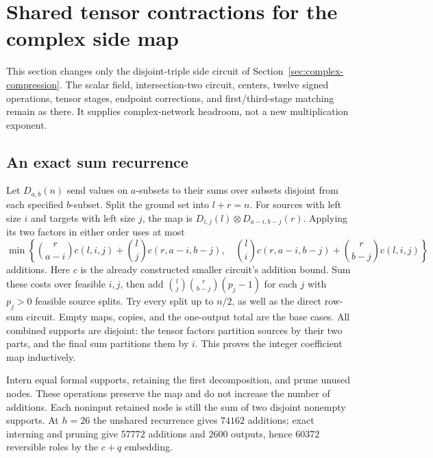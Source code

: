 \section{Shared tensor contractions for the complex side map}
\label{sec:disjoint-tensor-compression}
This section changes only the disjoint-triple side circuit of
Section~\ref{sec:complex-compression}. The scalar field, intersection-two
circuit, centers, twelve signed operations, tensor stages, endpoint
corrections, and first/third-stage matching remain as there. It supplies
complex-network headroom, not a new multiplication exponent.

\subsection{An exact sum recurrence}
Let $D_{a,b}(n)$ send values on $a$-subsets to their sums over subsets
disjoint from each specified $b$-subset. Split the ground set into $l+r=n$.
For sources with left size $i$ and targets with left size $j$, the map is
$D_{i,j}(l)\otimes D_{a-i,b-j}(r)$. Applying its two factors in either order
uses at most
\[
 \min\left\{\binom r{a-i}c(l,i,j)+\binom lj c(r,a-i,b-j),\quad
 \binom li c(r,a-i,b-j)+\binom r{b-j}c(l,i,j)\right\}
\]
additions. Here $c$ is the already constructed smaller circuit's addition
bound. Sum these costs over feasible $i,j$, then add
$\binom lj\binom r{b-j}(p_j-1)$ for each $j$ with $p_j>0$ feasible source
splits. Try every split up to $n/2$, as well as the direct row-sum circuit.
Empty maps, copies, and the one-output total are the base cases.
All combined supports are disjoint: the tensor factors partition sources
by their two parts, and the final sum partitions them by $i$.
This proves the integer coefficient map inductively.

Intern equal formal supports, retaining the first decomposition, and prune
unused nodes. These operations preserve the map and do not increase the
number of additions. Each noninput retained node is still the sum of two
disjoint nonempty supports. At $h=26$ the unshared recurrence gives $74162$
additions; exact interning and pruning give $57772$ additions and $2600$
outputs, hence $60372$ reversible roles by the $c+q$ embedding.

